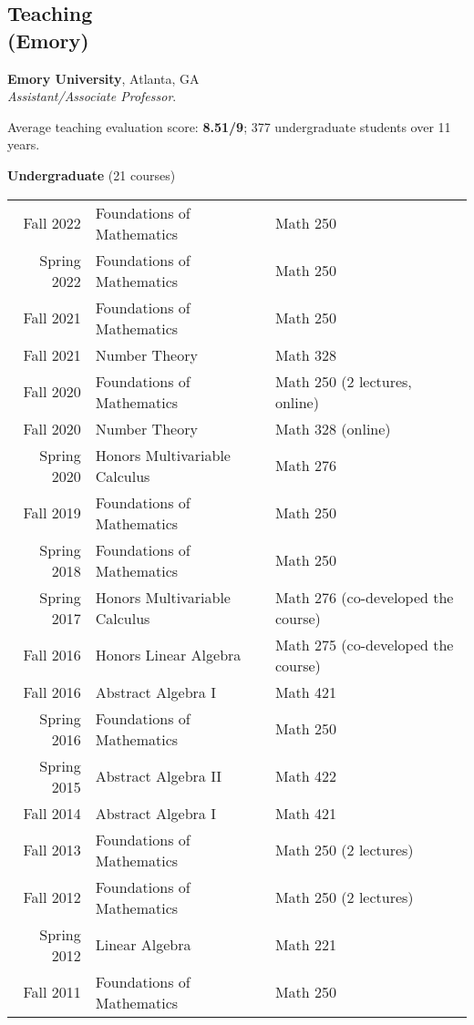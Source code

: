 \documentclass[margin,line]{res}
\newcommand{\defi}[1]{\textsf{#1}} 				%
\begin{document}
\begin{resume}
\section{\sc Teaching \\ (Emory)}

{\bf Emory University}, Atlanta, GA\\
\emph{Assistant/Associate Professor}. 
\vspace{2pt}

Average teaching evaluation score: \textbf{8.51/9}; 377 undergraduate students over 11 years. 
\vspace{2pt}



{\bf Undergraduate} (21 courses)
\vspace*{-.1in}

\begin{tabular}{rll}
 Fall 2022 & \defi{Foundations of Mathematics} & Math 250\\  
 Spring 2022 & \defi{Foundations of Mathematics} & Math 250\\
 Fall 2021 & \defi{Foundations of Mathematics} & Math 250  \\
 Fall 2021 & \defi{Number Theory} & Math 328   \\   
 Fall 2020 & \defi{Foundations of Mathematics} & Math 250 (2 lectures, online) \\
 Fall 2020 & \defi{Number Theory} & Math 328 (online)  \\    
 Spring 2020 & \defi{Honors Multivariable Calculus} & Math 276 \\
 Fall 2019 & \defi{Foundations of Mathematics} & Math 250 \\
 Spring 2018 & \defi{Foundations of Mathematics} & Math 250 \\
 Spring 2017 & \defi{Honors Multivariable Calculus} & Math 276  (co-developed the course) \\
 Fall 2016 & \defi{Honors Linear Algebra} & Math 275 (co-developed the course) \\
 Fall 2016 & \defi{Abstract Algebra I} & Math 421 \\
 Spring 2016 & \defi{Foundations of Mathematics} & Math 250 \\
 Spring 2015 & \defi{Abstract Algebra II} & Math 422 \\
 Fall 2014 & \defi{Abstract Algebra I} & Math 421 \\
 Fall 2013 & \defi{Foundations of Mathematics} & Math 250 (2 lectures) \\
 Fall 2012 & \defi{Foundations of Mathematics} & Math 250 (2 lectures) \\
 Spring 2012 & \defi{Linear Algebra} & Math 221 \\
 Fall 2011 & \defi{Foundations of Mathematics} & Math 250 \\
\end{tabular}


\end{resume}
\end{document}
